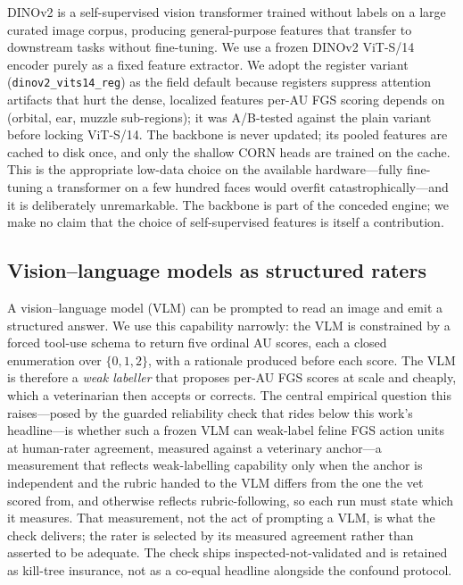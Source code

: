 DINOv2 \cite{oquab2023dinov2} is a self-supervised vision transformer trained
without labels on a large curated image corpus, producing general-purpose
features that transfer to downstream tasks without fine-tuning. We use a frozen
DINOv2 ViT-S/14 encoder purely as a fixed feature extractor. We adopt the
register variant (\texttt{dinov2\_vits14\_reg}) as the field default because
registers suppress attention artifacts that hurt the dense, localized features
per-AU FGS scoring depends on (orbital, ear, muzzle sub-regions); it was
A/B-tested against the plain variant before locking ViT-S/14. The backbone is
never updated; its pooled features are cached to disk once, and only the shallow
CORN heads are trained on the cache. This is the appropriate low-data choice on
the available hardware---fully fine-tuning a transformer on a few hundred faces
would overfit catastrophically---and it is deliberately unremarkable. The
backbone is part of the conceded engine; we make no claim that the choice of
self-supervised features is itself a contribution.

\subsection{Vision--language models as structured raters}
\label{subsec:bg-vlm}

A vision--language model (VLM) can be prompted to read an image and emit a
structured answer. We use this capability narrowly: the VLM is constrained by a
forced tool-use schema to return five ordinal AU scores, each a closed
enumeration over $\{0,1,2\}$, with a rationale produced before each score. The
VLM is therefore a \emph{weak labeller} that proposes per-AU FGS scores at
scale and cheaply, which a veterinarian then accepts or corrects. The central
empirical question this raises---posed by the guarded reliability check that
rides below this work's headline---is
whether such a frozen VLM can weak-label feline FGS action units at
human-rater agreement, measured against a veterinary anchor---a measurement that
reflects weak-labelling capability only when the anchor is independent and the
rubric handed to the VLM differs from the one the vet scored from, and otherwise
reflects rubric-following, so each run must state which it measures. That
measurement, not the act of prompting a VLM, is what the check delivers; the
rater is selected by its measured agreement rather than asserted to be adequate.
The check ships inspected-not-validated and is retained as kill-tree insurance,
not as a co-equal headline alongside the confound protocol.

